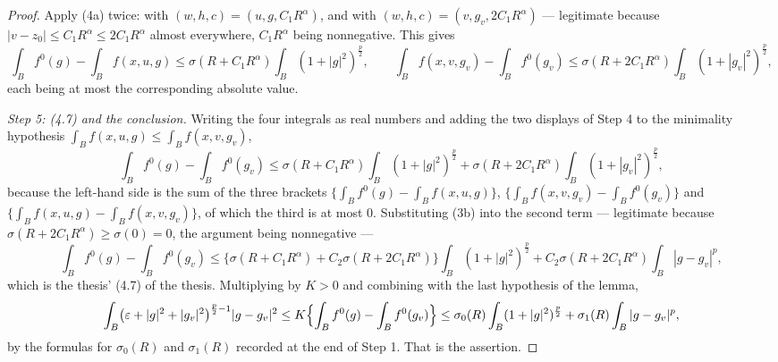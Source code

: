 \begin{proof}
Apply (4a) twice: with $(w,h,c)=(u,g,C_1R^{\alpha})$, and with
$(w,h,c)=(v,g_v,2C_1R^{\alpha})$ --- legitimate because
$|v-z_0|\le C_1R^{\alpha}\le2C_1R^{\alpha}$ almost everywhere, $C_1R^{\alpha}$
being nonnegative.  This gives
\[
\int_Bf^0(g)-\int_Bf(x,u,g)\le\sigma(R+C_1R^{\alpha})\int_B(1+|g|^2)^{\frac p2},
\qquad
\int_Bf(x,v,g_v)-\int_Bf^0(g_v)
\le\sigma(R+2C_1R^{\alpha})\int_B(1+|g_v|^2)^{\frac p2},
\]
each being at most the corresponding absolute value.

\emph{Step 5: \textup{(4.7)} and the conclusion.}  Writing the four integrals
as real numbers and adding the two displays of Step 4 to the minimality
hypothesis $\int_Bf(x,u,g)\le\int_Bf(x,v,g_v)$,
\[
\int_Bf^0(g)-\int_Bf^0(g_v)
\le\sigma(R+C_1R^{\alpha})\int_B(1+|g|^2)^{\frac p2}
+\sigma(R+2C_1R^{\alpha})\int_B(1+|g_v|^2)^{\frac p2},
\]
because the left-hand side is the sum of the three brackets
$\bigl\{\int_Bf^0(g)-\int_Bf(x,u,g)\bigr\}$,
$\bigl\{\int_Bf(x,v,g_v)-\int_Bf^0(g_v)\bigr\}$ and
$\bigl\{\int_Bf(x,u,g)-\int_Bf(x,v,g_v)\bigr\}$, of which the third is at most
$0$.  Substituting (3b) into the second term --- legitimate because
$\sigma(R+2C_1R^{\alpha})\ge\sigma(0)=0$, the argument being nonnegative ---
\[
\int_Bf^0(g)-\int_Bf^0(g_v)
\le\bigl\{\sigma(R+C_1R^{\alpha})+C_2\sigma(R+2C_1R^{\alpha})\bigr\}
\int_B(1+|g|^2)^{\frac p2}
+C_2\sigma(R+2C_1R^{\alpha})\int_B|g-g_v|^{p} ,
\]
which is the thesis' (4.7) of the thesis.  Multiplying by $K>0$ and combining with
the last hypothesis of the lemma,
\[
\int_B\bigl(\varepsilon+|g|^2+|g_v|^2\bigr)^{\frac p2-1}|g-g_v|^2
\le K\Bigl\{\int_Bf^0(g)-\int_Bf^0(g_v)\Bigr\}
\le\sigma_0(R)\int_B(1+|g|^2)^{\frac p2}+\sigma_1(R)\int_B|g-g_v|^{p},
\]
by the formulas for $\sigma_0(R)$ and $\sigma_1(R)$ recorded at the end of
Step 1.  That is the assertion.
\end{proof}

